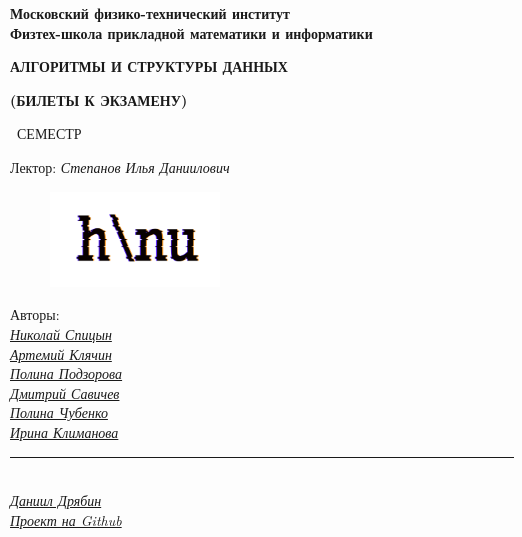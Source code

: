 
\newcommand{\GithubLink}{https://github.com/MIPT-Group/Lectures_Tex_Club}

\begin{titlepage}
	\clearpage\thispagestyle{empty}
	\centering
	
	
	\textbf{Московский физико-технический институт \\ Физтех-школа прикладной математики и информатики}
	\vspace{20ex}
	\vspace{13ex}
	
	{\textbf{{АЛГОРИТМЫ И СТРУКТУРЫ ДАННЫХ}}}

	{\textbf{(БИЛЕТЫ К ЭКЗАМЕНУ)}}
	
	\SemesterNumber\ СЕМЕСТР  
	\vspace{3ex}
	
	Лектор: \textit{Степанов Илья Даниилович}
	
	\begin{figure}[!ht]
		\centering
		\includegraphics[width=0.4\textwidth]{images/logo_ltc.png}
	\end{figure}

	\begin{flushright}
		\noindent
		Авторы: 
		\\
		\href{https://vk.com/spitsynn}{\textit{Николай Спицын}}
		\\
		\href{https://vk.com/id340504554}{\textit{Артемий Клячин}}
		\\
		\href{https://vk.com/id165779384}{\textit{Полина Подзорова}}
		\\
		\href{https://vk.com/dimasav123}{\textit{Дмитрий Савичев}}
		\\
		\href{https://vk.com/poli.dobro}{\textit{Полина Чубенко}}
		\\
		\href{https://vk.com/meraklim}{\textit{Ирина Климанова}}
		\\
		\rule{90pt}{0.5pt}
		\\
		\href{https://vk.com/ax_equals_b}{\textit{Даниил Дрябин}}
		\\
		\href{\GithubLink}{\textit{Проект на Github}}
	\end{flushright}
	
	\vfill
	\CourseDate
	\pagebreak
\end{titlepage}